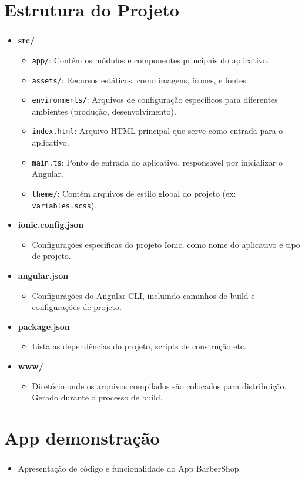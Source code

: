 \documentclass[aspectratio=169]{beamer}
\begin{document}
	\section{Estrutura do Projeto}
	\begin{frame}[fragile]
		\frametitle{\secname}
		\begin{itemize}
			\item \textbf{src/}
			\begin{itemize}
				\item \texttt{app/}: Contém os módulos e componentes principais do aplicativo.
				\item \texttt{assets/}: Recursos estáticos, como imagens, ícones, e fontes.
				\item \texttt{environments/}: Arquivos de configuração específicos para diferentes ambientes (produção, desenvolvimento).
				\item \texttt{index.html}: Arquivo HTML principal que serve como entrada para o aplicativo.
				\item \texttt{main.ts}: Ponto de entrada do aplicativo, responsável por inicializar o Angular.
				\item \texttt{theme/}: Contém arquivos de estilo global do projeto (ex: \texttt{variables.scss}).
			\end{itemize}
			\item \textbf{ionic.config.json}
			\begin{itemize}
				\item Configurações específicas do projeto Ionic, como nome do aplicativo e tipo de projeto.
			\end{itemize}
			\item \textbf{angular.json}
			\begin{itemize}
				\item Configurações do Angular CLI, incluindo caminhos de build e configurações de projeto.
			\end{itemize}
			\item \textbf{package.json}
			\begin{itemize}
				\item Lista as dependências do projeto, scripts de construção etc.
			\end{itemize}
			\item \textbf{www/}
			\begin{itemize}
				\item Diretório onde os arquivos compilados são colocados para distribuição. Gerado durante o processo de build.
			\end{itemize}
		\end{itemize}
	\end{frame}

	
	\section{App demonstração}
	\begin{frame}[fragile]
		\frametitle{\secname}
		\begin{itemize}
			\item Apresentação de código e funcionalidade do App BarberShop.
		\end{itemize}
	\end{frame}
	
\end{document}
